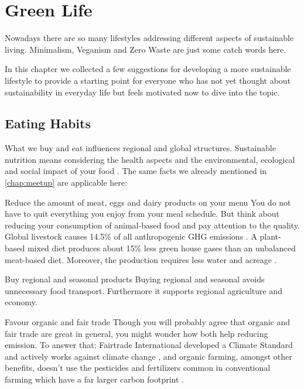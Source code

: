 
\chapter{Green Life}\label{chap:more}
 
Nowadays there are so many lifestyles addressing different aspects of sustainable living. Minimalism, Veganism and Zero Waste are just some catch words here. 

In this chapter we collected a few suggestions for developing a more sustainable lifestyle to provide a starting point for everyone who has not yet thought about sustainability in everyday life but feels motivated now to dive into the topic.

\section{Eating Habits} 
 	What we buy and eat influences regional and global structures. Sustainable nutrition means considering the health aspects and the environmental, ecological and social impact of your food \cite{food}. The same facts we already mentioned in \cref{chap:meetup} are applicable here:
 	
\begin{suggest}{Reduce the amount of meat, eggs and dairy products on your menu}%
 	You do not have to quit everything you enjoy from your meal schedule. But think about reducing your consumption of animal-based food and pay attention to the quality. Global livestock causes 14.5\% of all anthropogenic GHG emissions \cite{livestock}.
 	A plant-based mixed diet produces about 15\% less green house gases than an unbalanced meat-based diet. Moreover, the production requires less water and acreage \cite{food}. 
\end{suggest}
 	
\begin{suggest}{Buy regional and seasonal products}
  	Buying regional and seasonal avoids unnecessary food transport. 
  	Furthermore it supports regional agriculture and economy. 
\end{suggest}

\begin{suggest}{Favour organic and fair trade}
	Though you will probably agree that organic and fair trade are great in general, you might wonder how both help reducing emission. To answer that: Fairtrade International developed a Climate Standard and actively works against climate change \cite{fairtrade}, and organic farming, amongst other benefits, doesn't use the pesticides and fertilizers common in conventional farming which have a far larger carbon footprint \cite{organic}.
\end{suggest}

